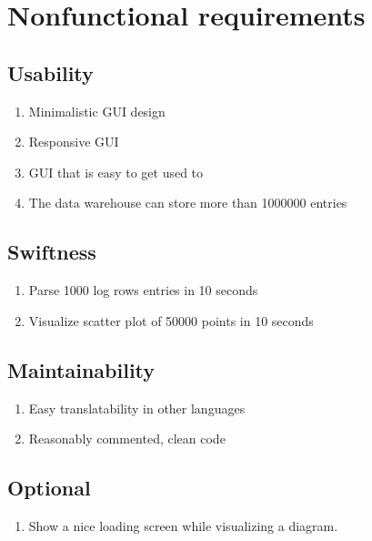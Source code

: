 \section{Nonfunctional requirements}

\renewcommand{\theenumi}{/N\arabic{enumi}0/}
\renewcommand{\labelenumi}{\theenumi}

 
\subsection{Usability}

\begin{enumerate}
  \item Minimalistic \gls{GUI} design
  \item Responsive \gls{GUI}
  \item \gls{GUI} that is easy to get used to
  \label{N1}
  \item The \gls{data warehouse} can store more than 1000000 entries
\end{enumerate}

\subsection{Swiftness}

\begin{enumerate}[resume] %
	\item Parse 1000 log \glspl{row} entries in 10 seconds
	
	\item Visualize \gls{scatter plot} of 50000 points in 10 seconds %
\end{enumerate}

\subsection{Maintainability}

\begin{enumerate}[resume]
  \item Easy translatability in other languages
  \item Reasonably commented, clean code
\end{enumerate}


\subsection{Optional}

\begin{enumerate}[resume]
  \item Show a nice loading screen while visualizing a \gls{diagram}. 
\end{enumerate}